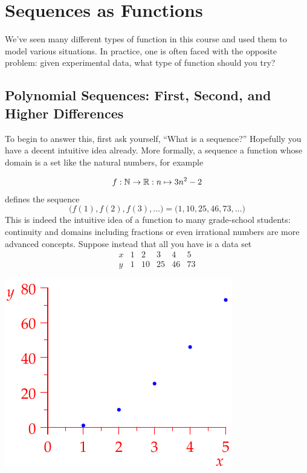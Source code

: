 \graphicspath{{4seq/asy/}}

\section{Sequences as Functions}

We've seen many different types of function in this course and used them to model various situations. In practice, one is often faced with the opposite problem: given experimental data, what type of function should you try?

\subsection{Polynomial Sequences: First, Second, and Higher Differences}

To begin to answer this, first ask yourself, ``What is a sequence?'' Hopefully you have a decent intuitive idea already. More formally, a sequence a function whose domain is a set like the natural numbers, for example\par
\begin{minipage}[t]{0.6\linewidth}\vspace{-8pt}
	\[
		f:\mathbb{N}\to\mathbb{R}:n\mapsto 3n^2-2
	\]
	defines the sequence
	\[
		\bigl(f(1),f(2),f(3),\ldots\bigr)=\bigl(1,10,25,46,73,\ldots\bigr)
	\]
	This is indeed the intuitive idea of a function to many grade-school students: continuity and domains including fractions or even irrational numbers are more advanced concepts.\medbreak
	Suppose instead that all you have is a data set
	\[
		\begin{array}{c|ccccc}
			x&1&2&3&4&5\\\hline
			y&1&10&25&46&73
		\end{array}
	\]
\end{minipage}
\hfill
\begin{minipage}[t]{0.39\linewidth}\vspace{-12pt}
	\flushright\includegraphics[scale=0.95]{seqquadex}
\end{minipage}
\bigbreak

